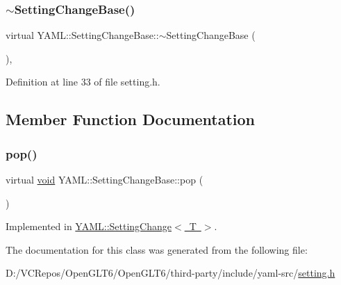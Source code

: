 \subsubsection{\texorpdfstring{$\sim$SettingChangeBase()}{~SettingChangeBase()}}
{\footnotesize\ttfamily virtual Y\+A\+M\+L\+::\+Setting\+Change\+Base\+::$\sim$\+Setting\+Change\+Base (\begin{DoxyParamCaption}{ }\end{DoxyParamCaption})\hspace{0.3cm}{\ttfamily [inline]}, {\ttfamily [virtual]}}



Definition at line 33 of file setting.\+h.



\subsection{Member Function Documentation}
\mbox{\label{class_y_a_m_l_1_1_setting_change_base_a189c55070d4636271b3504aacd097e8c}} 
\subsubsection{\texorpdfstring{pop()}{pop()}}
{\footnotesize\ttfamily virtual \mbox{\hyperlink{glad_8h_a950fc91edb4504f62f1c577bf4727c29}{void}} Y\+A\+M\+L\+::\+Setting\+Change\+Base\+::pop (\begin{DoxyParamCaption}{ }\end{DoxyParamCaption})\hspace{0.3cm}{\ttfamily [pure virtual]}}



Implemented in \mbox{\hyperlink{class_y_a_m_l_1_1_setting_change_a6af6bc2842d1992e1320fdd3e4d5350e}{Y\+A\+M\+L\+::\+Setting\+Change$<$ T $>$}}.



The documentation for this class was generated from the following file\+:\begin{DoxyCompactItemize}
\item 
D\+:/\+V\+C\+Repos/\+Open\+G\+L\+T6/\+Open\+G\+L\+T6/third-\/party/include/yaml-\/src/\mbox{\hyperlink{setting_8h}{setting.\+h}}\end{DoxyCompactItemize}
